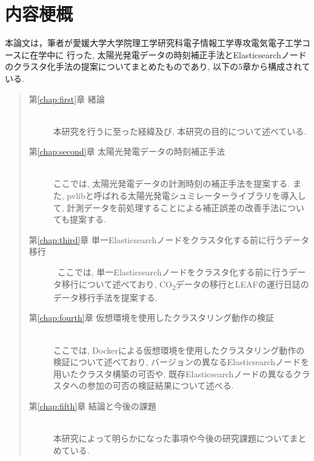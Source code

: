 \chapter*{内容梗概}

本論文は，筆者が愛媛大学大学院理工学研究科電子情報工学専攻電気電子工学コースに在学中に
行った, 太陽光発電データの時刻補正手法とElasticsearchノードのクラスタ化手法の提案についてまとめたものであり, 以下の5章から構成されている.\\

\begin{quote}
      \begin{description}

            \item[第\ref{chap:first}章 緒論]\ \\
            本研究を行うに至った経緯及び, 本研究の目的について述べている.
            \vspace{3.0mm}
            
            \item[第\ref{chap:second}章 太陽光発電データの時刻補正手法]\ \\
            ここでは, 太陽光発電データの計測時刻の補正手法を提案する. また, pvlibと呼ばれる太陽光発電シュミレーターライブラリを導入して, 計測データを前処理することによる補正誤差の改善手法についても提案する.
            \vspace{3.0mm}
            
            \item[第\ref{chap:third}章 単一Elasticsearchノードをクラスタ化する前に行うデータ移行]\
            ここでは, 単一Elasticsearchノードをクラスタ化する前に行うデータ移行について述べており, CO\textsubscript{2}データの移行とLEAFの運行日誌のデータ移行手法を提案する.
            \vspace{3.0mm}
            
            \item[第\ref{chap:fourth}章 仮想環境を使用したクラスタリング動作の検証]\ \\
            ここでは, Dockerによる仮想環境を使用したクラスタリング動作の検証について述べており, バージョンの異なるElasticsearchノードを用いたクラスタ構築の可否や, 既存Elasticsearchノードの異なるクラスタへの参加の可否の検証結果について述べる.
            \vspace{3.0mm}
            
            \item[第\ref{chap:fifth}章 結論と今後の課題]\ \\
            本研究によって明らかになった事項や今後の研究課題についてまとめている.
      \end{description}
\end{quote}
